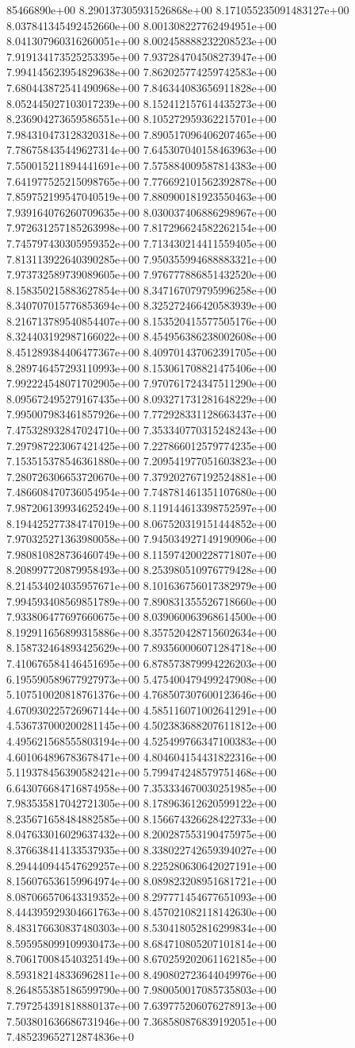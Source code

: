 85466890e+00	8.290137305931526868e+00	8.171055235091483127e+00	8.037841345492452660e+00	8.001308227762494951e+00	8.041307960316260051e+00	8.002458888232208523e+00	7.919134173525253395e+00	7.937284704508273947e+00	7.994145623954829638e+00	7.862025774259742583e+00	7.680443872541490968e+00	7.846344083656911828e+00	8.052445027103017239e+00	8.152412157614435273e+00	8.236904273659586551e+00	8.105272959362215701e+00	7.984310473128320318e+00	7.890517096406207465e+00	7.786758435449627314e+00	7.645307040158463963e+00	7.550015211894441691e+00	7.575884009587814383e+00	7.641977525215098765e+00	7.776692101562392878e+00	7.859752199547040519e+00	7.880900181923550463e+00	7.939164076260709635e+00	8.030037406886298967e+00	7.972631257185263998e+00	7.817296624582262154e+00	7.745797430305959352e+00	7.713430214411559405e+00	7.813113922640390285e+00	7.950355994688883321e+00	7.973732589739089605e+00	7.976777886851432520e+00	8.158350215883627854e+00	8.347167079795996258e+00	8.340707015776853694e+00	8.325272466420583939e+00	8.216713789540854407e+00	8.153520415577505176e+00	8.324403192987166022e+00	8.454956386238002608e+00	8.451289384406477367e+00	8.409701437062391705e+00	8.289746457293110993e+00	8.153061708821475406e+00	7.992224548071702905e+00	7.970761724347511290e+00	8.095672495279167435e+00	8.093271731281648229e+00	7.995007983461857926e+00	7.772928331128663437e+00	7.475328932847024710e+00	7.353340770315248243e+00	7.297987223067421425e+00	7.227866012579774235e+00	7.153515378546361880e+00	7.209541977051603823e+00	7.280726306653720670e+00	7.379202767192524881e+00	7.486608470736054954e+00	7.748781461351107680e+00	7.987206139934625249e+00	8.119144613398752597e+00	8.194425277384747019e+00	8.067520319151444852e+00	7.970325271363980058e+00	7.945034927149190906e+00	7.980810828736460749e+00	8.115974200228771807e+00	8.208997720879958493e+00	8.253980510976779428e+00	8.214534024035957671e+00	8.101636756017382979e+00	7.994593408569851789e+00	7.890831355526718660e+00	7.933806477697660675e+00	8.039060063968614500e+00	8.192911656899315886e+00	8.357520428715602634e+00	8.158732464893425629e+00	7.893560006071284718e+00	7.410676584146451695e+00	6.878573879994226203e+00	6.195590589677927973e+00	5.475400479499247908e+00	5.107510020818761376e+00	4.768507307600123646e+00	4.670930225726967144e+00	4.585116071002641291e+00	4.536737000200281145e+00	4.502383688207611812e+00	4.495621568555803194e+00	4.525499766347100383e+00	4.601064896783678471e+00	4.804604154431822316e+00	5.119378456390582421e+00	5.799474248579751468e+00	6.643076684716874958e+00	7.353334670030251985e+00	7.983535817042721305e+00	8.178963612620599122e+00	8.235671658484882585e+00	8.156674326628422733e+00	8.047633016029637432e+00	8.200287553190475975e+00	8.376638414133537935e+00	8.338022742659394027e+00	8.294440944547629257e+00	8.225280630642027191e+00	8.156076536159964974e+00	8.089823208951681721e+00	8.087066570643319352e+00	8.297771454677651093e+00	8.444395929304661763e+00	8.457021082118142630e+00	8.483176630837480303e+00	8.530418052816299834e+00	8.595958099109930473e+00	8.684710805207101814e+00	8.706170084540325149e+00	8.670259202061162185e+00	8.593182148336962811e+00	8.490802723644049976e+00	8.264855385186599790e+00	7.980050017085735803e+00	7.797254391818880137e+00	7.639775206076278913e+00	7.503801636686731946e+00	7.368580876839192051e+00	7.485239652712874836e+0